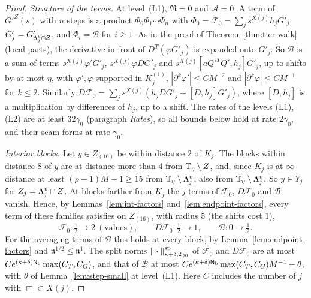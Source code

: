 \begin{proof}
\emph{Structure of the terms.} At level~(L1), $\mathfrak N=0$ and $\mathcal A=0$. A term of $G'^Z(s)$ with $n$ steps is a product $\Phi_0\Phi_1\cdots\Phi_n$ with $\Phi_0=\mathcal F_0=\sum_js^{X(j)}h_jG'_j$, $G'_j=G'_{\Lambda^v_j\cap Z}$, and $\Phi_i=\mathcal B$ for $i\ge1$. As in the proof of Theorem~\ref{thm:tier-walk} (local parts), the derivative in front of $D^T(\varphi G'_j)$ is expanded onto $G'_j$. So $\mathcal B$ is a sum of terms $s^{X(j)}\varphi'G'_j$, $s^{X(j)}\varphi DG'_j$ and $s^{X(j)}[aQ'^TQ',h_j]G'_j$, up to shifts by at most $\eta$, with $\varphi',\varphi$ supported in $K_j^{(1)}$, $|\partial^k\varphi'|\le CM^{-2}$ and $|\partial^k\varphi|\le CM^{-1}$ for $k\le2$. Similarly $D\mathcal F_0=\sum_js^{X(j)}(h_jDG'_j+[D,h_j]G'_j)$, where $[D,h_j]$ is a multiplication by differences of $h_j$, up to a shift. The rates of the levels (L1), (L2) are at least $32\gamma_0$ (paragraph \emph{Rates}), so all bounds below hold at rate $2\gamma_0$, and their seam forms at rate $\gamma_0$.

\emph{Interior blocks.} Let $y\in Z_{(16)}$ be within distance $2$ of $K_j$. The blocks within distance $8$ of $y$ are at distance more than $4$ from $\mathbb T_\eta\setminus Z$, and, since $K_j$ is at $\infty$-distance at least $(\rho-1)M-1\ge15$ from $\mathbb T_\eta\setminus\Lambda^v_j$, also from $\mathbb T_\eta\setminus\Lambda^v_j$. So $y\in Y_j$ for $Z_j=\Lambda^v_j\cap Z$. At blocks farther from $K_j$ the $j$-terms of $\mathcal F_0$, $D\mathcal F_0$ and $\mathcal B$ vanish. Hence, by Lemmas~\ref{lem:int-factors} and~\ref{lem:endpoint-factors}, every term of these families satisfies on $Z_{(16)}$, with radius $5$ (the shifts cost $1$),
\[
\mathcal F_0\colon\tfrac12\to2\ (\text{values}),\qquad D\mathcal F_0\colon\tfrac12\to1,\qquad\mathcal B\colon0\to\tfrac12 .
\]
For the averaging terms of $\mathcal B$ this holds at every block, by Lemma~\ref{lem:endpoint-factors} and $\mathfrak n^{1/2}\le\mathfrak n^1$. The split norms $\|\cdot\|^{\rm sp}_{\kappa+\delta,2\gamma_0}$ of $\mathcal F_0$ and $D\mathcal F_0$ are at most $Ce^{(\kappa+\delta)\mathsf N_{\rm b}}\max(C_T,C_G)$, and that of $\mathcal B$ at most $Ce^{(\kappa+\delta)\mathsf N_{\rm b}}\max(C_T,C_G)M^{-1}+\theta$, with $\theta$ of Lemma~\ref{lem:step-small} at level~(L1). Here $C$ includes the number of $j$ with $\Box\subset X(j)$.


\end{proof}
